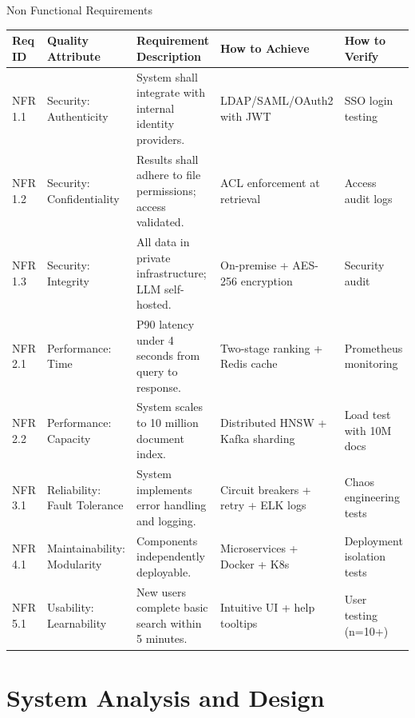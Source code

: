 \documentclass[aspectratio=169,xcolor=dvipsnames]{beamer}
\begin{document}
\begin{frame}{Non Functional Requirements}
    \tiny
    \renewcommand{\arraystretch}{0.70}
    \begin{table}
        \centering
        \begin{tabular}{p{}|p{}|p{}|p{}|p{}}
        \toprule
        \textbf{Req ID} & \textbf{Quality Attribute} & \textbf{Requirement Description} & \textbf{How to Achieve} & \textbf{How to Verify} \\
        \midrule
        NFR 1.1 & Security: Authenticity & System shall integrate with internal identity providers. & LDAP/SAML/OAuth2 with JWT & SSO login testing \\
        \midrule
        NFR 1.2 & Security: Confidentiality & Results shall adhere to file permissions; access validated. & ACL enforcement at retrieval & Access audit logs \\
        \midrule
        NFR 1.3 & Security: Integrity & All data in private infrastructure; LLM self-hosted. & On-premise + AES-256 encryption & Security audit \\
        \midrule
        NFR 2.1 & Performance: Time & P90 latency under 4 seconds from query to response. & Two-stage ranking + Redis cache & Prometheus monitoring \\
        \midrule
        NFR 2.2 & Performance: Capacity & System scales to 10 million document index. & Distributed HNSW + Kafka sharding & Load test with 10M docs \\
        \midrule
        NFR 3.1 & Reliability: Fault Tolerance & System implements error handling and logging. & Circuit breakers + retry + ELK logs & Chaos engineering tests \\
        \midrule
        NFR 4.1 & Maintainability: Modularity & Components independently deployable. & Microservices + Docker + K8s & Deployment isolation tests \\
        \midrule
        NFR 5.1 & Usability: Learnability & New users complete basic search within 5 minutes. & Intuitive UI + help tooltips & User testing (n=10+) \\
        \bottomrule
        \end{tabular}
    \end{table}
\end{frame}

\section{System Analysis and Design}
\end{document}
